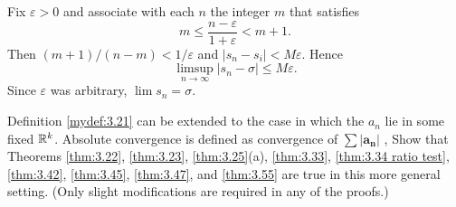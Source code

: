 \begin{myexercise}
\begin{asparaenum}[(a)]
        Fix $\varepsilon > 0$ and associate with each $n$ the integer $m$ that satisfies
        \begin{equation*}
            m \leq \frac{n - \varepsilon}{1 + \varepsilon}
            < m+1 .
        \end{equation*}
        Then $(m + 1)/(n - m) < 1/\varepsilon$ and $\left| s_n-s_i \right| < M\varepsilon$. Hence
        \begin{equation*}
            \limsup_{n \to \infty} \left| s_n - \sigma \right| \leq M \varepsilon .
        \end{equation*}
        Since $\varepsilon$ was arbitrary, $\lim s_n = \sigma$.
    \end{asparaenum}
\end{myexercise}

\begin{myexercise}
    \label{ex:3.15}
    Definition \ref{mydef:3.21} can be extended to the case
    in which the $a_n$ lie in some fixed ${\protect\mathbb R}^k$.
    Absolute convergence is defined as convergence of $\sum \left| \mathbf{a_n} \right|$ , 
    Show that Theorems \ref{thm:3.22}, \ref{thm:3.23}, \ref{thm:3.25}(a), \ref{thm:3.33}, \ref{thm:3.34 ratio test}, \ref{thm:3.42}, \ref{thm:3.45}, \ref{thm:3.47}, and \ref{thm:3.55} are true in this more general setting. 
    (Only slight modifications are required in any of the proofs.)
\end{myexercise}

